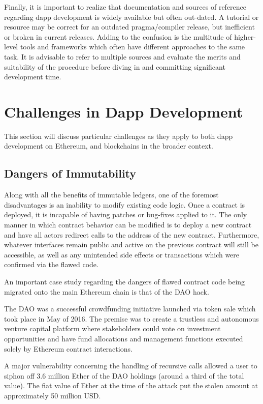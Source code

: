 Finally, it is important to realize that documentation and sources of reference regarding \ac{dapp}
development is widely available but often out-dated. A tutorial or resource may be correct for an
outdated pragma/compiler release, but inefficient or broken in current releases. Adding to the confusion
is the multitude of higher-level tools and frameworks which often have different approaches to the same
task. It is advisable to refer to multiple sources and evaluate the merits and suitability of the procedure
before diving in and committing significant development time.


\section{Challenges in Dapp Development}

This section will discuss particular challenges as they apply to both \ac{dapp} 
development on Ethereum, and blockchains in the broader context.

\subsection{Dangers of Immutability}

Along with all the benefits of immutable ledgers, one of the foremost disadvantages
is an inability to modify existing code logic. Once a contract is deployed, it
is incapable of having patches or bug-fixes applied to it. The only manner in which
contract behavior can be modified is to deploy a new contract and have all actors
redirect calls to the address of the new contract. Furthermore, whatever interfaces
remain public and active on the previous contract will still be accessible, as well
as any unintended side effects or transactions which were confirmed via the flawed
code.

An important case study regarding the dangers of flawed contract code
being migrated onto the main Ethereum chain is that of the DAO hack. \cite{DaoHack}

The DAO was a successful crowdfunding initiative launched via token sale which took place
in May of 2016. The premise was to create a trustless and autonomous venture capital
platform where stakeholders could vote on investment opportunities and have fund
allocations and management functions executed solely by Ethereum contract interactions.

A major vulnerability concerning the handling of recursive calls allowed a user to
siphon off 3.6 million Ether of the DAO holdings (around a third of the total value).
The fiat value of Ether at the time of the attack put the stolen amount at approximately
50 million USD.

